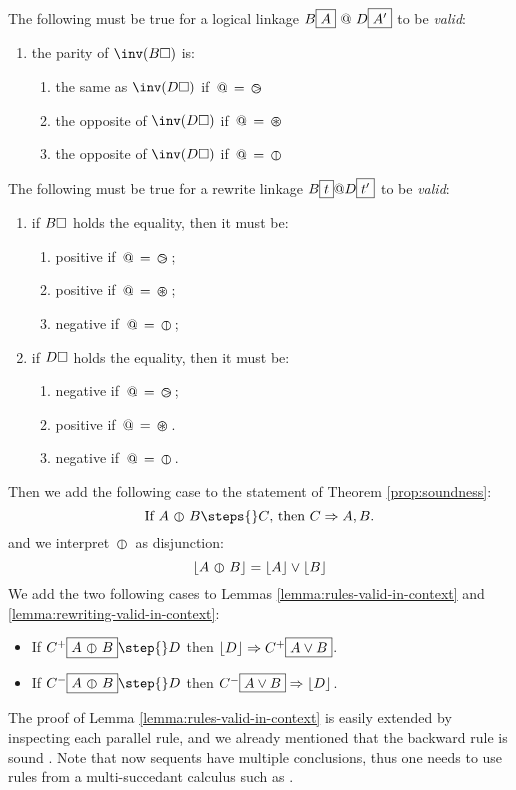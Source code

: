 \begin{condition}\label{cond:pol-classical}
  
  The following must be true for a logical linkage $B\fbox{$A$}\operatorname{\,@\,}
  D\fbox{$A'$}$ to be \emph{ valid}:
  \begin{enumerate}
    \item the parity of $\inv(B\hole)$ is:
      \begin{enumerate}
        \item the same as $\inv(D\hole)$ if $\operatorname{\,@\,} = \operatorname{\,\varogreaterthan\,}$
        \item the opposite of $\inv(D\hole)$ if $\operatorname{\,@\,} = \operatorname{\,\varoast\,}$
        \item the opposite of $\inv(D\hole)$ if $\operatorname{\,@\,} = \operatorname{\,\varobar\,}$
      \end{enumerate}\label{clause:opposite}
  \end{enumerate}

  The following must be true for a rewrite linkage $B\fbox{$t$} @ D\fbox{$t'$}$
  to be \emph{ valid}:
  \begin{enumerate}
    \item if $B\square$ holds the equality, then it must be:
      \begin{enumerate}
        \item positive if $\operatorname{\,@\,} = \operatorname{\,\varogreaterthan\,}$;
        \item positive if $\operatorname{\,@\,} = \operatorname{\,\varoast\,}$;
        \item negative if $\operatorname{\,@\,} = \operatorname{\,\varobar\,}$;
      \end{enumerate}
    \item if $D\square$ holds the equality, then it must be:
      \begin{enumerate} 
        \item negative if $\operatorname{\,@\,} = \operatorname{\,\varogreaterthan\,}$;
        \item positive if $\operatorname{\,@\,} = \operatorname{\,\varoast\,}$.
        \item negative if $\operatorname{\,@\,} = \operatorname{\,\varobar\,}$.
      \end{enumerate}
  \end{enumerate}
\end{condition}

Then we add the following case to the statement of Theorem \ref{prop:soundness}:
  $$\text{If $A \para B \steps{} C$, then $C \seq A, B$.}$$
and we interpret $\operatorname{\,\varobar\,}$ as disjunction:
  $$\lfloor A \operatorname{\,\varobar\,} B\rfloor = \lfloor A\rfloor \lor \lfloor B\rfloor$$
We add the two following cases to Lemmas \ref{lemma:rules-valid-in-context} and
\ref{lemma:rewriting-valid-in-context}:
\begin{itemize}
  \item If $C^+\select{A\para B}\step{} D$ then $\lfloor D\rfloor \Rightarrow C^+\fbox{$A\lor B$}$.
  \item If $C^-\select{A\para B}\step{} D$ then $C^-\fbox{$A\lor B$}\Rightarrow \lfloor D\rfloor$.
\end{itemize}
The proof of Lemma \ref{lemma:rules-valid-in-context} is easily extended by
inspecting each parallel rule, and we already mentioned that the backward rule
{} is sound . Note that now sequents have multiple
conclusions, thus one needs to use rules from a multi-succedant calculus such as
 \cite{negri_structural_2001}.

